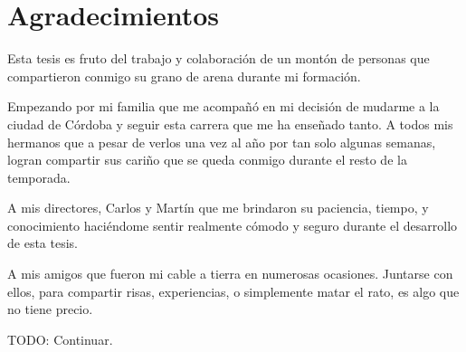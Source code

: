 \chapter*{\center \Large  Agradecimientos}
Esta tesis es fruto del trabajo y colaboración de un montón de personas que
compartieron conmigo su grano de arena durante mi formación.

Empezando por mi familia que me acompañó en mi decisión de mudarme a la ciudad
de Córdoba y seguir esta carrera que me ha enseñado tanto. A todos mis hermanos
que a pesar de verlos una vez al año por tan solo algunas semanas, logran
compartir sus cariño que se queda conmigo durante el resto de la temporada.

A mis directores, Carlos y Martín que me brindaron su paciencia, tiempo, y
conocimiento haciéndome sentir realmente cómodo y seguro durante el desarrollo
de esta tesis. 

A mis amigos que fueron mi cable a tierra en numerosas ocasiones. Juntarse con
ellos, para compartir risas, experiencias, o simplemente matar el rato, es algo
que no tiene precio.

TODO: Continuar.